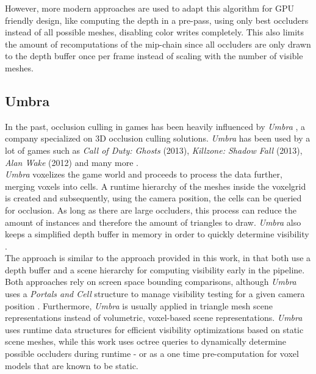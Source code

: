 \noindent
However, more modern approaches are used to adapt this algorithm for \ac{GPU} friendly design, like computing the depth 
in a pre-pass, using only best occluders instead of all possible meshes, disabling color writes completely. This also 
limits the amount of recomputations of the mip-chain since all occluders are only drawn to the depth buffer once per 
frame instead of scaling with the number of visible meshes.

\subsection*{Umbra}

In the past, occlusion culling in games has been heavily influenced by \emph{Umbra} \cite{Umbra2024}, a company 
specialized on 3D occlusion culling solutions. \emph{Umbra} has been used by a lot of games such as 
\emph{Call of Duty: Ghosts} (2013), \emph{Killzone: Shadow Fall} (2013), \emph{Alan Wake} (2012) and many more 
\cite{UmbraWiki,CallOfDutyGhostsCredits,KillzoneUmbra,AlanWakeUmbra}. \\

\noindent
\emph{Umbra} voxelizes the game world and proceeds to process the data further, merging voxels into cells. 
A runtime hierarchy of the meshes inside the voxelgrid is created and subsequently, using the camera position, 
the cells can be queried for occlusion. As long as there are large occluders, this process can reduce the amount 
of instances and therefore the amount of triangles to draw. \emph{Umbra} also keeps a simplified depth buffer in 
memory in order to quickly determine visibility \cite{Medium2018}. \\

\noindent 
The approach is similar to the approach provided  in this work, in that both use a depth buffer and a scene hierarchy 
for computing visibility early in the pipeline. Both approaches rely on screen space bounding comparisons, although 
\emph{Umbra} uses a \emph{Portals and Cell} structure to manage visibility testing for a given camera position 
\cite{Medium2018}. Furthermore, \emph{Umbra} is usually applied in triangle mesh scene representations instead 
of volumetric, voxel-based scene representations. \emph{Umbra} uses runtime data structures for efficient visibility 
optimizations based on static scene meshes, while this work uses octree queries to dynamically determine possible 
occluders during runtime - or as a one time pre-computation for voxel models that are known to be static. \\


